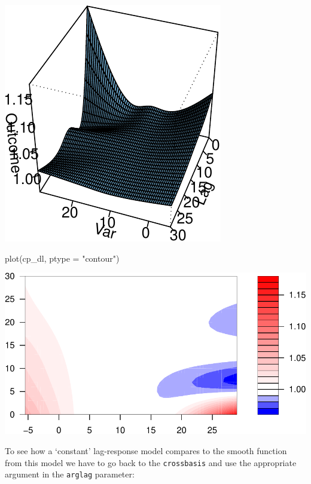 \documentclass[
]{book}
\newenvironment{Shaded}{\begin{snugshade}}{\end{snugshade}}
\newcommand{\AttributeTok}[1]{\textcolor[rgb]{0.77,0.63,0.00}{#1}}
\newcommand{\DecValTok}[1]{\textcolor[rgb]{0.00,0.00,0.81}{#1}}
\newcommand{\FunctionTok}[1]{\textcolor[rgb]{0.00,0.00,0.00}{#1}}
\newcommand{\NormalTok}[1]{#1}
\newcommand{\OtherTok}[1]{\textcolor[rgb]{0.56,0.35,0.01}{#1}}
\newcommand{\SpecialCharTok}[1]{\textcolor[rgb]{0.00,0.00,0.00}{#1}}
\newcommand{\StringTok}[1]{\textcolor[rgb]{0.31,0.60,0.02}{#1}}
\begin{document}
\includegraphics{adv_epi_analysis_files/figure-latex/unnamed-chunk-107-1.pdf}

\begin{Shaded}
\begin{Highlighting}[]
\FunctionTok{plot}\NormalTok{(cp\_dl, }\AttributeTok{ptype =} \StringTok{"contour"}\NormalTok{)}
\end{Highlighting}
\end{Shaded}

\includegraphics{adv_epi_analysis_files/figure-latex/unnamed-chunk-107-2.pdf}

To see how a `constant' lag-response model compares to the smooth function from this model we have to go back to the \texttt{crossbasis} and use the appropriate argument in the \texttt{arglag} parameter:

\begin{Shaded}
\end{Shaded}
\end{document}
